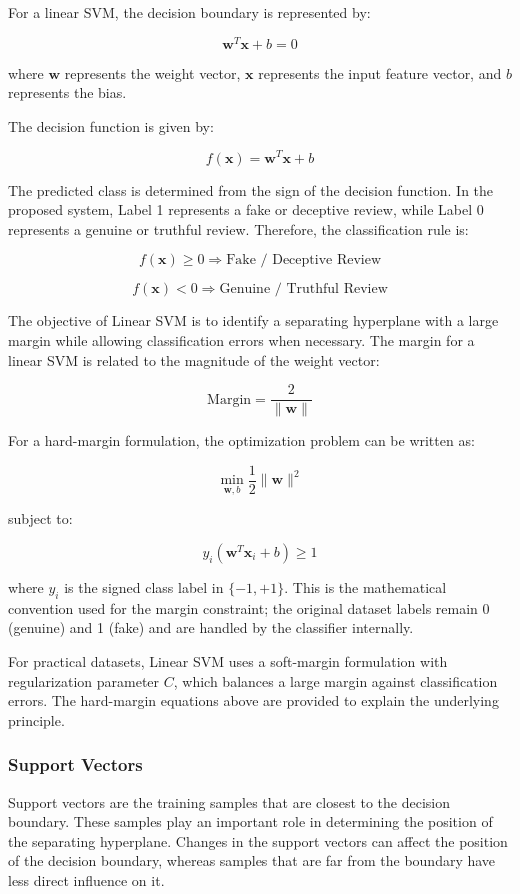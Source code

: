 \documentclass[12pt,a4paper]{report}
\begin{document}
For a linear SVM, the decision boundary is represented by:

\[
\mathbf{w}^{T}\mathbf{x}+b=0
\]

where \(\mathbf{w}\) represents the weight vector, \(\mathbf{x}\) represents the input feature vector, and \(b\) represents the bias.

The decision function is given by:

\[
f(\mathbf{x})=\mathbf{w}^{T}\mathbf{x}+b
\]

The predicted class is determined from the sign of the decision function. In the proposed system, Label 1 represents a fake or deceptive review, while Label 0 represents a genuine or truthful review. Therefore, the classification rule is:

\[
f(\mathbf{x}) \geq 0
\Rightarrow \text{Fake / Deceptive Review}
\]

\[
f(\mathbf{x}) < 0
\Rightarrow \text{Genuine / Truthful Review}
\]

The objective of Linear SVM is to identify a separating hyperplane with a large margin while allowing classification errors when necessary. The margin for a linear SVM is related to the magnitude of the weight vector:

\[
\text{Margin}=\frac{2}{\|\mathbf{w}\|}
\]

For a hard-margin formulation, the optimization problem can be written as:

\[
\min_{\mathbf{w},b}
\frac{1}{2}\|\mathbf{w}\|^2
\]

subject to:

\[
y_i(\mathbf{w}^{T}\mathbf{x}_i+b)\geq1
\]

where \(y_i\) is the signed class label in \(\{-1,+1\}\). This is the mathematical convention used for the margin constraint; the original dataset labels remain 0 (genuine) and 1 (fake) and are handled by the classifier internally.

For practical datasets, Linear SVM uses a soft-margin formulation with regularization parameter \(C\), which balances a large margin against classification errors. The hard-margin equations above are provided to explain the underlying principle.

\subsubsection*{Support Vectors}

Support vectors are the training samples that are closest to the decision boundary. These samples play an important role in determining the position of the separating hyperplane. Changes in the support vectors can affect the position of the decision boundary, whereas samples that are far from the boundary have less direct influence on it.
\end{document}
